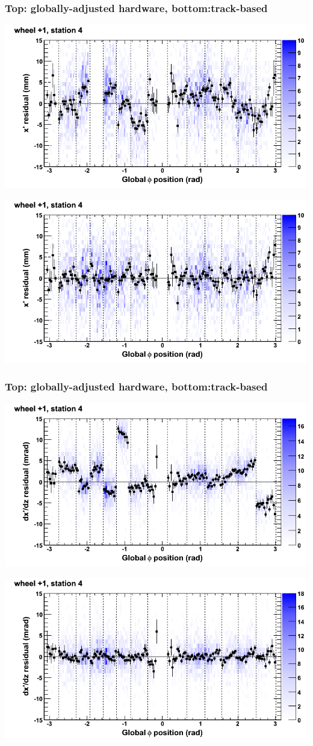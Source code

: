 \documentclass[compress]{beamer}
\begin{document}
\begin{frame}
\frametitle{Top: globally-adjusted hardware, bottom:track-based}
\includegraphics[width=0.7\linewidth]{NOV4_mapplots_HW/DTvsphi_st4whD_x.png}

\includegraphics[width=0.7\linewidth]{NOV4_mapplots/DTvsphi_st4whD_x.png}
\end{frame}

\begin{frame}
\frametitle{Top: globally-adjusted hardware, bottom:track-based}
\includegraphics[width=0.7\linewidth]{NOV4_mapplots_HW/DTvsphi_st4whD_dxdz.png}

\includegraphics[width=0.7\linewidth]{NOV4_mapplots/DTvsphi_st4whD_dxdz.png}
\end{frame}
\end{document}
